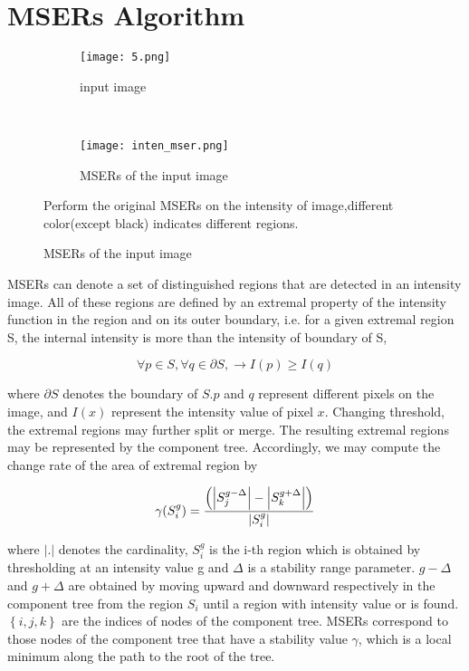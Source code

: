 \section{MSERs Algorithm}

\begin{figure}[H] \label{defumser}
	\centering
	\begin{subfigure}[b]{0.4\textwidth}
		\centering
		\texttt{[image: 5.png]}
		\caption{input image}
	\end{subfigure}
	~  
	\begin{subfigure}[b]{0.4\textwidth} 
		\centering
		\texttt{[image: inten\_mser.png]}
		\caption{MSERs of the input image}	
	\end{subfigure}

	
	Perform the original MSERs on the intensity of image,different color(except black) indicates different regions.
\end{figure}


MSERs can denote a set of distinguished regions that are detected in an intensity image. All of these regions are defined by an extremal property of the intensity function in the region and on its outer boundary, i.e. for a given extremal region S, the internal intensity is more than the intensity of boundary of S,

\[ \forall p \in S,\forall q \in \partial S , \longrightarrow I(p) \geq I(q)\]

where $\partial S $ denotes the boundary of $S$.$p$ and $q$ represent different pixels on the image, and $I(x)$ represent the intensity value of pixel $x$. 
Changing threshold, the extremal regions may further split or merge. The resulting extremal regions may be represented by the component tree. Accordingly, we may compute the change rate of the area of extremal region by

\[ \gamma(S_i^g) = \frac{\left ( \left |  S_j^{g-\Delta} \right |-\left |  S_k^{g+\Delta} \right | \right )}{\arrowvert S_i^g\arrowvert} \]

where $ \left | .  \right |$  denotes the cardinality, $ S_{i}^{g} $  is the i-th region which is obtained by thresholding at an intensity value g and $\Delta $ is a stability range parameter. $  g-\Delta $ and $ g+\Delta $ are obtained by moving upward and downward respectively in the component tree from the region $ S_{i} $ until a region with intensity value   or  is found. $ \left \{ i,j,k \right \}$ are the indices of nodes of the component tree. MSERs correspond to those nodes of the component tree that have a stability value $\gamma$, which is a local minimum along the path to the root of the tree.


